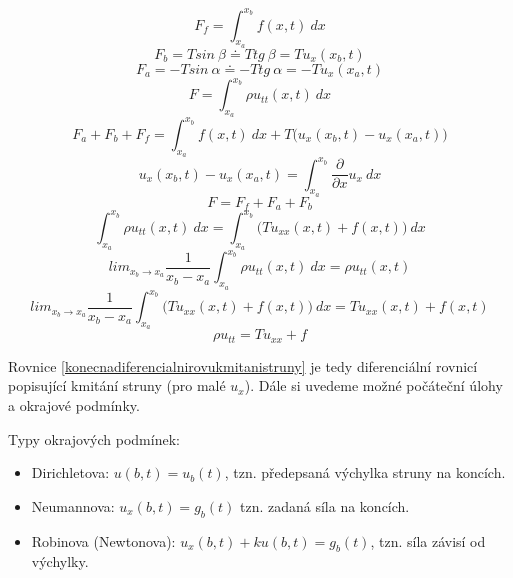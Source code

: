 \documentclass[a4]{report}
\theoremstyle{definition}
\begin{document}
\begin{equation}
F_f=\int_{x_a}^{x_b} f(x,t)\ dx
\end{equation}
\begin{equation}
F_b=T sin \ \beta \doteq T tg\ \beta=T u_x (x_b,t)
\end{equation}
\begin{equation}
F_a=-T sin \ \alpha \doteq -T tg\ \alpha=-T u_x (x_a,t)
\end{equation}
\begin{equation}
F=\int_{x_a}^{x_b} \rho u_{tt}(x,t)\ dx
\end{equation}
\begin{equation}
F_a+F_b+F_f=\int_{x_a}^{x_b}f(x,t)\ dx+T\bigg(u_x(x_b,t)-u_x(x_a,t)\bigg)
\end{equation}
\begin{equation}
u_x(x_b,t)-u_x(x_a,t)=\int_{x_a}^{x_b} \frac{\partial }{\partial x} u_x \ dx
\end{equation}
\begin{equation}
F=F_f+F_a+F_b
\end{equation}
\begin{equation}
\int_{x_a}^{x_b} \rho u_{tt}(x,t)\ dx=\int_{x_a}^{x_b} \bigg( Tu_{xx}(x,t)+f(x,t)\bigg)\ dx
\end{equation}
\begin{equation}
lim_{x_b \rightarrow x_a} \frac{1}{x_b-x_a} \int_{x_a}^{x_b} \rho u_{tt}(x,t)\ dx=\rho u_{tt}(x,t)
\end{equation}
\begin{equation}
lim_{x_b \rightarrow x_a} \frac{1}{x_b-x_a} \int_{x_a}^{x_b} \bigg( Tu_{xx}(x,t)+f(x,t) \bigg)\  dx=Tu_{xx}(x,t)+f(x,t)
\end{equation}
\begin{equation}
\rho u_{tt}=Tu_{xx}+f
\label{konecnadiferencialnirovukmitanistruny}
\end{equation}
 
 Rovnice \ref{konecnadiferencialnirovukmitanistruny} je tedy diferenciální rovnicí popisující kmitání struny (pro malé $u_x$). Dále si uvedeme možné počáteční úlohy a okrajové podmínky.
 
 Typy okrajových podmínek:
 \begin{itemize}
 \item Dirichletova: $u(b,t)=u_b(t)$, tzn. předepsaná výchylka struny na koncích.
 \item Neumannova: $u_x(b,t)=g_b(t)$ tzn. zadaná síla na koncích.
 \item Robinova (Newtonova): $u_x(b,t)+ku(b,t)=g_b(t)$, tzn. síla závisí od výchylky.
 \end{itemize}
\end{document}
